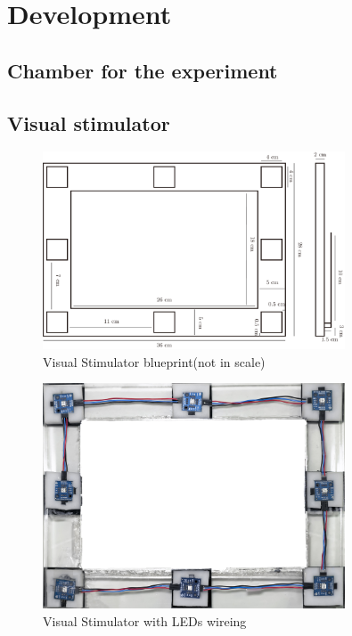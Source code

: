 \chapter{Development}

\label{ch:Development}

\setlength{\parindent}{4em}
\setlength{\parskip}{1em}
\renewcommand{\baselinestretch}{1.5}

\section{Chamber for the experiment}

\section{Visual stimulator}


\begin{figure}[ht]
	\centering
	\includegraphics[width=0.8\textwidth]{chapter6/blueprint.pdf}
	\caption{Visual Stimulator blueprint(not in scale)}
\end{figure}

\begin{figure}[ht]
	\centering
	\includegraphics[width=0.8\textwidth]{chapter6/frame_LED.jpg}
	\caption{Visual Stimulator with LEDs wireing}
\end{figure}

